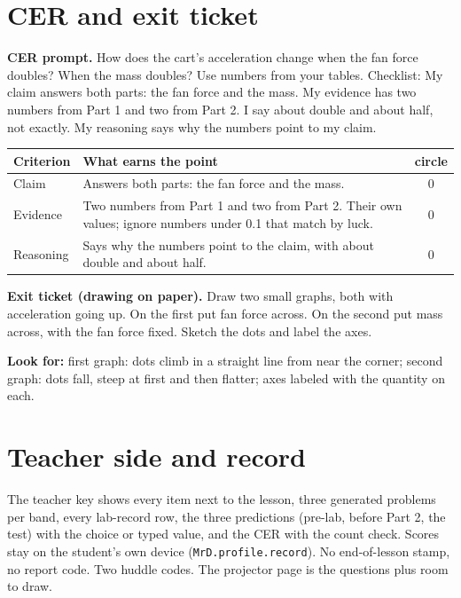 \documentclass[10pt]{article}
\begin{document}
\section{CER and exit ticket}
\textbf{CER prompt.} How does the cart's acceleration change when the fan force doubles? When the mass doubles? Use numbers from your tables. Checklist: My claim answers both parts: the fan force and the mass. My evidence has two numbers from Part 1 and two from Part 2. I say about double and about half, not exactly. My reasoning says why the numbers point to my claim.\par
\begin{tabularx}{\linewidth}{@{}l Y c@{}}\toprule \textbf{Criterion} & \textbf{What earns the point} & \textbf{circle}\\\midrule
Claim & Answers both parts: the fan force and the mass. & 0\\
Evidence & Two numbers from Part 1 and two from Part 2. Their own values; ignore numbers under 0.1 that match by luck. & 0\\
Reasoning & Says why the numbers point to the claim, with about double and about half. & 0\\
\bottomrule\end{tabularx}
\textbf{Exit ticket (drawing on paper).} Draw two small graphs, both with acceleration going up. On the first put fan force across. On the second put mass across, with the fan force fixed. Sketch the dots and label the axes.\par
\textbf{Look for:} first graph: dots climb in a straight line from near the corner; second graph: dots fall, steep at first and then flatter; axes labeled with the quantity on each.

\section{Teacher side and record}
The teacher key shows every item next to the lesson, three generated problems per band, every lab-record row, the three predictions (pre-lab, before Part 2, the test) with the choice or typed value, and the CER with the count check. Scores stay on the student's own device (\texttt{MrD.profile.record}). No end-of-lesson stamp, no report code. Two huddle codes. The projector page is the questions plus room to draw.
\end{document}
